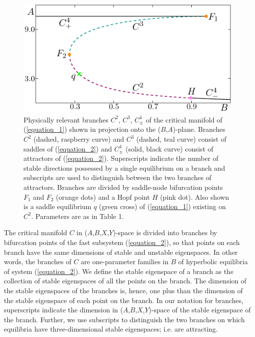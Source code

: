 \documentclass{ws-ijbc}
\begin{document}
\begin{figure}[!t]
\centering
\includegraphics[]{./figures/MKMO_1.pdf}
\caption{Physically relevant branches $C^2$, $C^3$, $C^4_\pm$ of the critical manifold of (\ref{equation_1}) shown in projection onto the ($B$,$A$)-plane.  Branches $C^2$ (dashed, raspberry curve) and $C^3$ (dashed, teal curve) consist of saddles of (\ref{equation_2}) and $C^4_\pm$ (solid, black curve) consist of attractors of (\ref{equation_2}).  Superscripts indicate the number of stable directions possessed by a single equilibrium on a branch and subscripts are used to distinguish between the two branches of attractors.  Branches are divided by saddle-node bifurcation points $F_1$ and $F_2$ (orange dots) and a Hopf point $H$ (pink dot).  Also shown is a saddle equilibrium $q$ (green cross) of (\ref{equation_1}) existing on $C^2$.  Parameters are as in Table 1.}
\label{figure_1}
\end{figure}

The critical manifold $C$ in ($A$,$B$,$X$,$Y$)-space is divided into branches by bifurcation points of the fast subsystem (\ref{equation_2}), so that points on each branch have the same dimensions of stable and unstable eigenspaces.  In other words, the branches of $C$ are one-parameter families in $B$ of hyperbolic equilibria of system (\ref{equation_2}).  We define the stable eigenspace of a branch as the collection of stable eigenspaces of all the points on the branch.  The dimension of the stable eigenspaces of the branches is, hence, one plus than the dimension of the stable eigenspace of each point on the branch.  In our notation for branches, superscripts indicate the dimension in ($A$,$B$,$X$,$Y$)-space of the stable eigenspace of the branch.  Further, we use subscripts to distinguish the two branches on which equilibria have three-dimensional stable eigenspaces; i.e. are attracting.  
\end{document}
